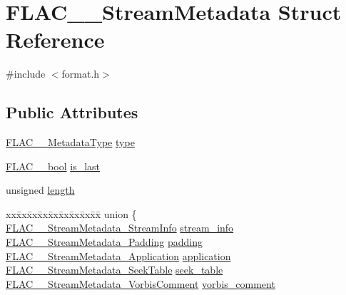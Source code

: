 \hypertarget{struct_f_l_a_c_____stream_metadata}{}\section{F\+L\+A\+C\+\_\+\+\_\+\+Stream\+Metadata Struct Reference}
\label{struct_f_l_a_c_____stream_metadata}


{\ttfamily \#include $<$format.\+h$>$}

\subsection*{Public Attributes}
\begin{DoxyCompactItemize}
\item 
\hyperlink{group__flac__format_gac71714ba8ddbbd66d26bb78a427fac01}{F\+L\+A\+C\+\_\+\+\_\+\+Metadata\+Type} \hyperlink{struct_f_l_a_c_____stream_metadata_a39fd0655464f2cc7c9c37ae715088aec}{type}
\item 
\hyperlink{ordinals_8h_a95103469f1cbd78b8cf250194985b34e}{F\+L\+A\+C\+\_\+\+\_\+bool} \hyperlink{struct_f_l_a_c_____stream_metadata_aef40bbf85abe12e035f66f2d54ed316c}{is\+\_\+last}
\item 
unsigned \hyperlink{struct_f_l_a_c_____stream_metadata_a3fd615e41609837a5672f9081d9d2183}{length}
\item 
\begin{tabbing}
xx\=xx\=xx\=xx\=xx\=xx\=xx\=xx\=xx\=\kill
union \{\\
\>\hyperlink{struct_f_l_a_c_____stream_metadata___stream_info}{FLAC\_\_StreamMetadata\_StreamInfo} \hyperlink{struct_f_l_a_c_____stream_metadata_a827c8671721b01ed3007adbe81ae0c6b}{stream\_info}\\
\>\hyperlink{struct_f_l_a_c_____stream_metadata___padding}{FLAC\_\_StreamMetadata\_Padding} \hyperlink{struct_f_l_a_c_____stream_metadata_a202f0ed2fa1dae32893be6025838f651}{padding}\\
\>\hyperlink{struct_f_l_a_c_____stream_metadata___application}{FLAC\_\_StreamMetadata\_Application} \hyperlink{struct_f_l_a_c_____stream_metadata_af16b029d4a476aeb46f9a215e2cce462}{application}\\
\>\hyperlink{struct_f_l_a_c_____stream_metadata___seek_table}{FLAC\_\_StreamMetadata\_SeekTable} \hyperlink{struct_f_l_a_c_____stream_metadata_a3d27e525001843d173f8c97987663aa7}{seek\_table}\\
\>\hyperlink{struct_f_l_a_c_____stream_metadata___vorbis_comment}{FLAC\_\_StreamMetadata\_VorbisComment} \hyperlink{struct_f_l_a_c_____stream_metadata_a02662cb0ff19e8229dcd2384f708bae0}{vorbis\_comment}\\

\end{tabbing}
\end{DoxyCompactItemize}
